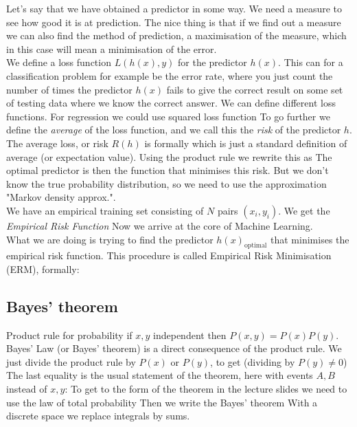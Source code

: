 \noindent Let's say that we have obtained a predictor in some way. We need a measure to see how good it is at prediction.
The nice thing is that if we find out a measure we can also find the method of prediction, a maximisation of the measure,
which in this case will mean a minimisation of the error.\\
\indent We define a loss function $L(h(x), y)$ for the predictor $h(x)$. This can for a classification problem for example be the error rate, where
you just count the number of times the predictor $h(x)$ fails to give the correct result on some set of testing data where
we know the correct answer. We can define different loss functions. For regression we could use squared loss function
To go further we define the \emph{average} of the loss function, and we call this the \emph{risk} of the predictor $h$.
The average loss, or risk $R(h)$  is formally
which is just a standard definition of average (or expectation value).
Using the product rule we rewrite this as
The optimal predictor is then the function that minimises this risk. But we don't know the true probability distribution,
so we need to use the approximation "Markov density approx.".\\
\indent We have an empirical training set consisting of $N$ pairs $(x_i,y_i)$. We get the \emph{Empirical Risk Function}
Now we arrive at the core of Machine Learning.\\
What we are doing is trying to find the predictor $h(x)_{\mathrm{optimal}}$ that minimises the empirical risk function. This procedure is
called Empirical Risk Minimisation (ERM), formally:
\subsection{Bayes' theorem}
Product rule for probability
if $x,y$ independent then $P(x,y) = P(x)P(y)$.\\
\indent Bayes' Law (or Bayes' theorem) is a direct consequence of the product rule.
We just divide the product rule by $P(x)$ or $P(y)$, to get (dividing by $P(y) \neq 0$)
The last equality is the usual statement of the theorem, here with events $A,B$ instead of $x,y$:
To get to the form of the theorem in the lecture slides we need to use the law of total probability
Then we write the Bayes' theorem
With a discrete space we replace integrals by sums.